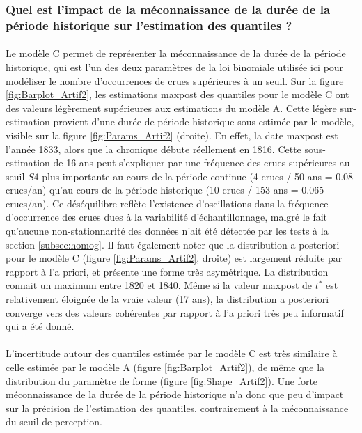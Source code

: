 	\subsubsection{Quel est l'impact de la méconnaissance de la durée de la période historique sur l'estimation des quantiles ?}	
	
	\paragraph{} Le modèle C permet de représenter la méconnaissance de la durée de la période historique, qui est l'un des deux paramètres de la loi binomiale utilisée ici pour modéliser le nombre d'occurrences de crues supérieures à un seuil. Sur la figure \ref{fig:Barplot_Artif2}, les estimations maxpost des quantiles pour le modèle C ont des valeurs légèrement supérieures aux estimations du modèle A. Cette légère sur-estimation provient d'une durée de période historique sous-estimée par le modèle, visible sur la figure \ref{fig:Params_Artif2} (droite). En effet, la date maxpost est l'année 1833, alors que la chronique débute réellement en 1816. Cette sous-estimation de 16 ans peut s'expliquer par une fréquence des crues supérieures au seuil $S4$ plus importante au cours de la période continue (4 crues / 50 ans = 0.08 crues/an) qu'au cours de la période historique (10 crues / 153 ans = 0.065 crues/an). Ce déséquilibre reflète l'existence d'oscillations dans la fréquence d'occurrence des crues dues à la variabilité d'échantillonnage, malgré le fait qu'aucune non-stationnarité des données n'ait été détectée par les tests à la section \ref{subsec:homog}. Il faut également noter que la distribution a posteriori pour le modèle C (figure \ref{fig:Params_Artif2}, droite) est largement réduite par rapport à l'a priori, et présente une forme très asymétrique. La distribution connait un maximum entre 1820 et 1840. Même si la valeur maxpost de $t^*$ est relativement éloignée de la vraie valeur (17 ans), la distribution a posteriori converge vers des valeurs cohérentes par rapport à l'a priori très peu informatif qui a été donné. 	 
	
	\paragraph{} L'incertitude autour des quantiles estimée par le modèle C est très similaire à celle estimée par le modèle A (figure \ref{fig:Barplot_Artif2}), de même que la distribution du paramètre de forme (figure \ref{fig:Shape_Artif2}). Une forte méconnaissance de la durée de la période historique n'a donc que peu d'impact sur la précision de l'estimation des quantiles, contrairement à la méconnaissance du seuil de perception.
	
